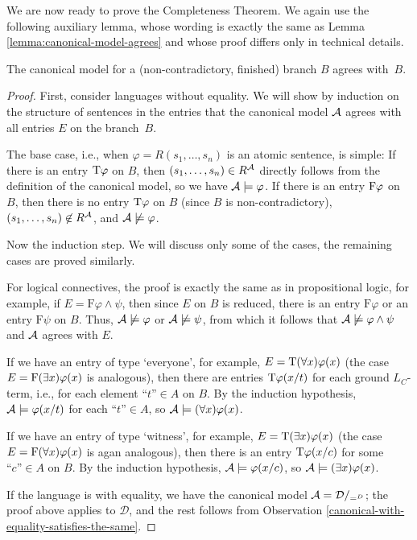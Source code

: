 We are now ready to prove the Completeness Theorem. We again use the following auxiliary lemma, whose wording is exactly the same as Lemma \ref{lemma:canonical-model-agrees} and whose proof differs only in technical details.

\begin{lemma}\label{lemma:canonical-model-agrees-predicate}
    The canonical model for a (non-contradictory, finished) branch $B$ agrees with~$B$.
\end{lemma}
\begin{proof}
First, consider languages without equality. We will show by induction on the structure of sentences in the entries that the canonical model $\mathcal{A}$ agrees with all entries $E$ on the branch~$B$. 

The base case, i.e., when $\varphi=R(s_1,\dots,s_n)$ is an atomic sentence, is simple: If there is an entry $\mathrm{T}\varphi$ on $B$, then $(s_1,\dots,s_n)\in R^{\mathcal{A}}$ directly follows from the definition of the canonical model, so we have $\mathcal{A}\models\varphi$. If there is an entry $\mathrm{F}\varphi$ on $B$, then there is no entry $\mathrm{T}\varphi$ on $B$ (since $B$ is non-contradictory), $(s_1,\dots,s_n)\not\in R^{\mathcal{A}}$, and $\mathcal{A}\not\models\varphi$.

Now the induction step. We will discuss only some of the cases, the remaining cases are proved similarly. 

For logical connectives, the proof is exactly the same as in propositional logic, for example, if $E=\mathrm{F}\varphi\land\psi$, then since $E$ on $B$ is reduced, there is an entry $\mathrm{F}\varphi$ or an entry $\mathrm{F}\psi$ on $B$. Thus, $\mathcal{A}\not\models\varphi$ or $\mathcal{A}\not\models\psi$, from which it follows that $\mathcal{A}\not\models\varphi\land\psi$ and $\mathcal{A}$ agrees with $E$.

If we have an entry of type `everyone', for example, $E=\mathrm{T}(\forall x)\varphi(x)$ 
(the case $E=\mathrm{F}(\exists x)\varphi(x)$ is analogous), then there are entries $\mathrm{T}\varphi(x/t)$ for each ground $L_C$-term, i.e., for each element $\text{``$t$''}\in A$ on $B$. By the induction hypothesis, $\mathcal{A}\models\varphi(x/t)$ for each $\text{``$t$''}\in A$, so $\mathcal{A}\models(\forall x)\varphi(x)$.

If we have an entry of type `witness', for example, $E=\mathrm{T}(\exists x)\varphi(x)$ 
(the case $E=\mathrm{F}(\forall x)\varphi(x)$ is agan analogous), then there is an entry $\mathrm{T}\varphi(x/c)$ for some $\text{``$c$''}\in A$ on $B$. By the induction hypothesis, $\mathcal{A}\models\varphi(x/c)$, so $\mathcal{A}\models(\exists x)\varphi(x)$.

If the language is with equality, we have the canonical model $\mathcal{A}=\mathcal D/_{=^D}$; the proof above applies to $\mathcal D$, and the rest follows from Observation \ref{canonical-with-equality-satisfies-the-same}.
\end{proof}

